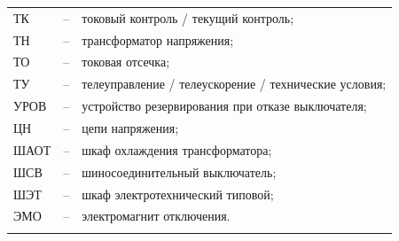 \begin{longtable}{>{\raggedright\arraybackslash}m{2cm}>{\raggedright\arraybackslash}m{0.5cm}>{\raggedright\arraybackslash}m{20cm}}
ТК & -- & токовый контроль / текущий контроль; \\
ТН & -- & трансформатор напряжения; \\
ТО & -- & токовая отсечка; \\
ТУ & -- & телеуправление / телеускорение / технические условия; \\
УРОВ & -- & устройство резервирования при отказе выключателя; \\
ЦН & -- & цепи напряжения; \\
ШАОТ & -- & шкаф охлаждения трансформатора; \\
ШСВ & -- & шиносоединительный выключатель; \\
ШЭТ & -- & шкаф электротехнический типовой; \\
ЭМО & -- & электромагнит отключения. \\
{\color{white}\fontsize{0.1pt}{0.1pt}\selectfont<endABBRS>}
\end{longtable}
